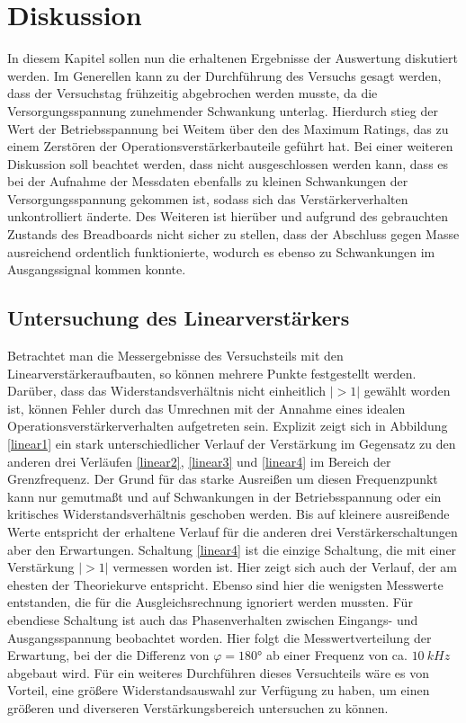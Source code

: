 \section{Diskussion}
In diesem Kapitel sollen nun die erhaltenen Ergebnisse der Auswertung diskutiert werden.
Im Generellen kann zu der Durchführung des Versuchs gesagt werden, dass der Versuchstag frühzeitig abgebrochen werden musste, da die Versorgungsspannung zunehmender Schwankung unterlag. Hierdurch stieg der Wert der Betriebsspannung bei Weitem über den des Maximum Ratings, das zu einem Zerstören der Operationsverstärkerbauteile geführt hat.
Bei einer weiteren Diskussion soll beachtet werden, dass nicht ausgeschlossen werden kann, dass es bei der Aufnahme der Messdaten ebenfalls zu kleinen Schwankungen der Versorgungsspannung gekommen ist, sodass sich das Verstärkerverhalten unkontrolliert änderte. Des Weiteren ist hierüber und aufgrund des gebrauchten Zustands des Breadboards nicht sicher zu stellen, dass der Abschluss gegen Masse ausreichend ordentlich funktionierte, wodurch es ebenso zu Schwankungen im Ausgangssignal kommen konnte.\\
\subsection*{Untersuchung des Linearverstärkers}
Betrachtet man die Messergebnisse des Versuchsteils mit den Linearverstärkeraufbauten, so können mehrere Punkte festgestellt werden. Darüber, dass das Widerstandsverhältnis nicht einheitlich $|>1|$ gewählt worden ist, können Fehler durch das Umrechnen mit der Annahme eines idealen Operationsverstärkerverhalten aufgetreten sein.
Explizit zeigt sich in Abbildung \ref{linear1} ein stark unterschiedlicher Verlauf der Verstärkung im Gegensatz zu den anderen drei Verläufen \ref{linear2}, \ref{linear3} und \ref{linear4} im Bereich der Grenzfrequenz. Der Grund für das starke Ausreißen um diesen Frequenzpunkt kann nur gemutmaßt und auf Schwankungen in der Betriebsspannung oder ein kritisches Widerstandsverhältnis geschoben werden. Bis auf kleinere ausreißende Werte entspricht der erhaltene Verlauf für die anderen drei Verstärkerschaltungen aber den Erwartungen. Schaltung \ref{linear4} ist die einzige Schaltung, die mit einer Verstärkung $|>1|$ vermessen worden ist. Hier zeigt sich auch der Verlauf, der am ehesten der Theoriekurve entspricht. Ebenso sind hier die wenigsten Messwerte entstanden, die für die Ausgleichsrechnung ignoriert werden mussten.
Für ebendiese Schaltung ist auch das Phasenverhalten zwischen Eingangs- und Ausgangsspannung beobachtet worden. Hier folgt die Messwertverteilung der Erwartung, bei der die Differenz von $\varphi=180°$ ab einer Frequenz von ca. $\SI{10}{kHz}$ abgebaut wird. Für ein weiteres Durchführen dieses Versuchteils wäre es von Vorteil, eine größere Widerstandsauswahl zur Verfügung zu haben, um einen größeren und diverseren Verstärkungsbereich untersuchen zu können.
